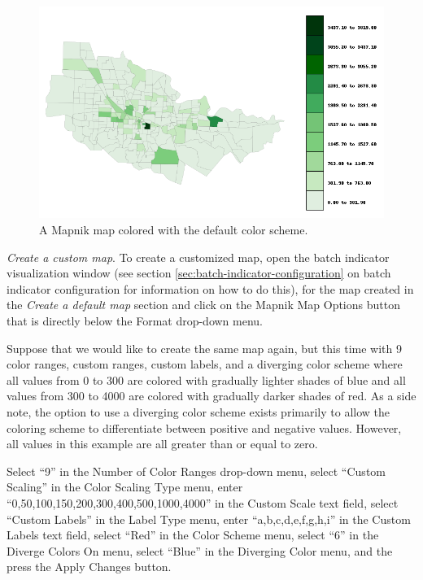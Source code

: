 \begin{figure}[ht]
\begin{center}
\includegraphics[width=\textwidth]{part-gui/images/sample-map-default-settings.png}
\end{center}
\caption{A Mapnik map colored with the default color scheme.}
\label{fig:sample-map-default-settings}
\end{figure}
\clearpage

\emph{Create a custom map}. 
To create a customized map, 
open the batch indicator visualization window (see section 
\ref{sec:batch-indicator-configuration} on batch indicator configuration for information on 
how to do this), for the map created in the \emph{Create a default map}
section and click on the Mapnik Map Options button that is directly 
below the Format drop-down menu.

Suppose that we would like to create the same map again, but this time 
with 9 color ranges, custom ranges, custom labels, and a diverging color 
scheme where all values from 0 to 300 are colored with gradually lighter 
shades of blue and all values from 300 to 4000 are colored with gradually 
darker shades of red. As a side note, the option to use a diverging color 
scheme exists primarily to allow the coloring scheme to differentiate 
between positive and negative values.  However, all values in 
this example are all greater than or equal to zero.

Select ``9'' in the Number of Color Ranges drop-down menu, select 
``Custom Scaling'' in the Color Scaling Type menu, enter 
``0,50,100,150,200,300,400,500,1000,4000'' in the Custom Scale text field, 
select ``Custom Labels'' in the Label Type menu, enter ``a,b,c,d,e,f,g,h,i'' 
in the Custom Labels text field, select ``Red'' in the Color Scheme menu, 
select ``6'' in the Diverge Colors On menu, select ``Blue'' in the Diverging 
Color menu, and the press the Apply Changes button.

